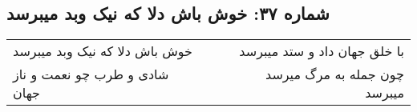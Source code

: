 \begin{center}
\section*{شماره ۳۷: خوش باش دلا که نیک وبد میبرسد}
\label{sec:037}
\begin{longtable}{l p{0.5cm} r}
خوش باش دلا که نیک وبد میبرسد
&&
با خلق جهان داد و ستد میبرسد
\\
شادی و طرب چو نعمت و ناز جهان
&&
چون جمله به مرگ میرسد میبرسد
\\
\end{longtable}
\end{center}
